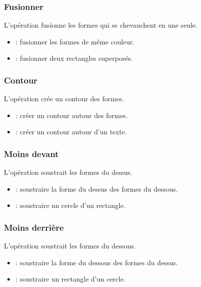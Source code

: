 \subsubsection{Fusionner}

L'opération  fusionne les formes qui se chevauchent en une seule.

\begin{itemize}
    \item {} : fusionner les formes de même couleur.
    \item {} : fusionner deux rectangles superposés.
\end{itemize}

\subsubsection{Contour}

L'opération  crée un contour des formes.

\begin{itemize}
    \item {} : créer un contour autour des formes.
    \item {} : créer un contour autour d'un texte.
\end{itemize}

\subsubsection{Moins devant}

L'opération  soustrait les formes du dessus.

\begin{itemize}
    \item {} : soustraire la forme du dessus des formes du dessous.
    \item {} : soustraire un cercle d'un rectangle.
\end{itemize}

\subsubsection{Moins derrière}

L'opération  soustrait les formes du dessous.

\begin{itemize}
    \item {} : soustraire la forme du dessous des formes du dessus.
    \item {} : soustraire un rectangle d'un cercle.
\end{itemize}


